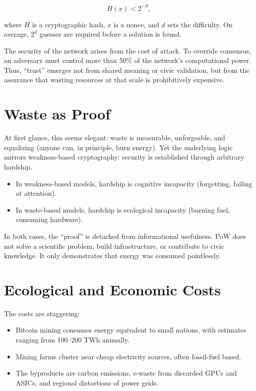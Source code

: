 \documentclass[openany]{book}
\begin{document}
\[ H(x) < 2^{-d}, \]

where $H$ is a cryptographic hash, $x$ is a nonce, and $d$ sets the difficulty. On average, $2^d$ guesses are required before a solution is found.

The security of the network arises from the cost of attack. To override consensus, an adversary must control more than 50\% of the network’s computational power. Thus, ``trust'' emerges not from shared meaning or civic validation, but from the assurance that wasting resources at that scale is prohibitively expensive.

\section{Waste as Proof}

At first glance, this seems elegant: waste is measurable, unforgeable, and equalizing (anyone can, in principle, burn energy). Yet the underlying logic mirrors weakness-based cryptography: security is established through arbitrary hardship.

\begin{itemize}
    \item In weakness-based models, hardship is cognitive incapacity (forgetting, failing at attention).
    \item In waste-based models, hardship is ecological incapacity (burning fuel, consuming hardware).
\end{itemize}

In both cases, the ``proof'' is detached from informational usefulness. PoW does not solve a scientific problem, build infrastructure, or contribute to civic knowledge. It only demonstrates that energy was consumed pointlessly.

\section{Ecological and Economic Costs}

The costs are staggering:

\begin{itemize}
    \item Bitcoin mining consumes energy equivalent to small nations, with estimates ranging from 100--200 TWh annually.
    \item Mining farms cluster near cheap electricity sources, often fossil-fuel based.
    \item The byproducts are carbon emissions, e-waste from discarded GPUs and ASICs, and regional distortions of power grids.
\end{itemize}
\end{document}
